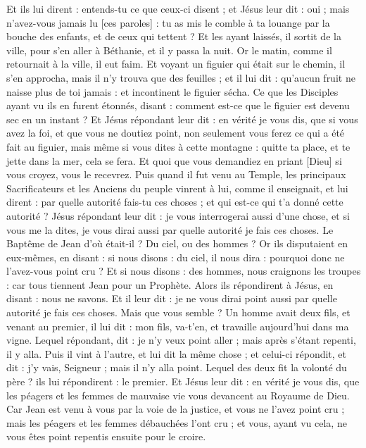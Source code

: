 \begin{multicols}{2}
Et ils lui dirent : entends-tu ce que ceux-ci disent ; et Jésus leur dit : oui ; mais n'avez-vous jamais lu [ces paroles] : tu as mis le comble à ta louange par la bouche des enfants, et de ceux qui tettent ?
Et les ayant laissés, il sortit de la ville, pour s'en aller à Béthanie, et il y passa la nuit.
Or le matin, comme il retournait à la ville, il eut faim.
Et voyant un figuier qui était sur le chemin, il s'en approcha, mais il n'y trouva que des feuilles ; et il lui dit : qu'aucun fruit ne naisse plus de toi jamais : et incontinent le figuier sécha.
Ce que les Disciples ayant vu ils en furent étonnés, disant : comment est-ce que le figuier est devenu sec en un instant ?
Et Jésus répondant leur dit : en vérité je vous dis, que si vous avez la foi, et que vous ne doutiez point, non seulement vous ferez ce qui a été fait au figuier, mais même si vous dites à cette montagne : quitte ta place, et te jette dans la mer, cela se fera.
Et quoi que vous demandiez en priant [Dieu] si vous croyez, vous le recevrez.
Puis quand il fut venu au Temple, les principaux Sacrificateurs et les Anciens du peuple vinrent à lui, comme il enseignait, et lui dirent : par quelle autorité fais-tu ces choses ; et qui est-ce qui t'a donné cette autorité ?
Jésus répondant leur dit : je vous interrogerai aussi d'une chose, et si vous me la dites, je vous dirai aussi par quelle autorité je fais ces choses.
Le Baptême de Jean d'où était-il ? Du ciel, ou des hommes ? Or ils disputaient en eux-mêmes, en disant : si nous disons : du ciel, il nous dira : pourquoi donc ne l'avez-vous point cru ?
Et si nous disons : des hommes, nous craignons les troupes : car tous tiennent Jean pour un Prophète.
Alors ils répondirent à Jésus, en disant : nous ne savons. Et il leur dit : je ne vous dirai point aussi par quelle autorité je fais ces choses.
Mais que vous semble ? Un homme avait deux fils, et venant au premier, il lui dit : mon fils, va-t'en, et travaille aujourd'hui dans ma vigne.
Lequel répondant, dit : je n'y veux point aller ; mais après s'étant repenti, il y alla.
Puis il vint à l'autre, et lui dit la même chose ; et celui-ci répondit, et dit : j'y vais, Seigneur ; mais il n'y alla point.
Lequel des deux fit la volonté du père ? ils lui répondirent : le premier. Et Jésus leur dit : en vérité je vous dis, que les péagers et les femmes de mauvaise vie vous devancent au Royaume de Dieu.
Car Jean est venu à vous par la voie de la justice, et vous ne l'avez point cru ; mais les péagers et les femmes débauchées l'ont cru ; et vous, ayant vu cela, ne vous êtes point repentis ensuite pour le croire.

\end{multicols}
